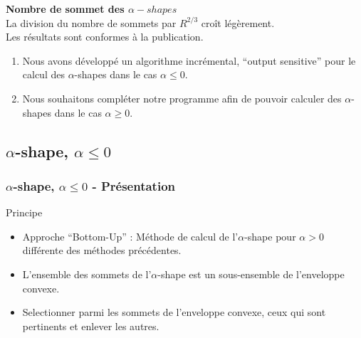 \begin{frame}
\begin{columns}[t]
\begin{column}{0.9\linewidth}
  \end{column}
\end{columns}

{
  \begin{exampleblock}{}
    \textbf{Nombre de sommet des $\alpha-shapes$}\\
    La division du nombre de sommets par $R^{2/3}$ croît légèrement.\\
    Les résultats sont conformes à la publication.\\
  \end{exampleblock} 
} 
{
  \begin{alertblock}{}
    \begin{enumerate}
      \item Nous avons développé un algorithme incrémental, ``output sensitive'' pour le calcul des $\alpha$-shapes dans le cas $\alpha \leq 0$. 
      \item Nous souhaitons compléter notre programme afin de pouvoir calculer des $\alpha$-shapes dans le cas $\alpha \geq 0$.
    \end{enumerate}
  \end{alertblock} 
} 
 
\end{frame}

\subsection{$\alpha$-shape, $\alpha \leq 0$}

\begin{frame}
\frametitle{$\alpha$-shape, $\alpha \leq 0$ - Présentation}
  \begin{block}{Principe}
    \begin{itemize}
      \item Approche ``Bottom-Up'' : Méthode de calcul de l'$\alpha$-shape pour $\alpha > 0$ différente des méthodes précédentes.
      \item L'ensemble des sommets de l'$\alpha$-shape est un sous-ensemble de l'enveloppe convexe.
      \item Selectionner parmi les sommets de l'enveloppe convexe, ceux qui sont pertinents et enlever les autres.
    \end{itemize}  
  \end{block}
\end{frame}

